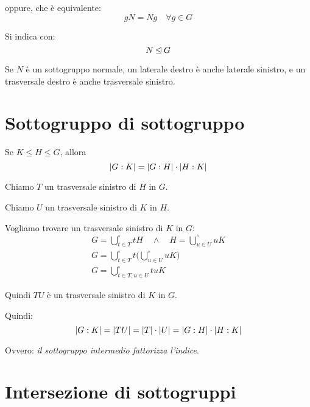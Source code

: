 oppure, che è equivalente:
\begin{equation*}
	gN = Ng \quad \forall g \in G
\end{equation*}

Si indica con:
\begin{equation*}
	N \unlhd G
\end{equation*}

Se $N$ è un sottogruppo normale, un laterale destro è anche laterale sinistro, e un trasversale destro è anche trasversale sinistro.

\section{Sottogruppo di sottogruppo}
\label{sec:sottogruppo di sottogruppo}

\begin{teorema}
	\label{thr:fattorizzazione_indici}
	Se $K \le H \le G$, allora
	\begin{equation*}
		\lvert G:K \rvert = \lvert G:H \rvert \cdot \lvert H:K \rvert
	\end{equation*}
\end{teorema}
\begin{dimostrazione}
	Chiamo $T$ un trasversale sinistro di $H$ in $G$.
	
	Chiamo $U$ un trasversale sinistro di $K$ in $H$.
	
	Vogliamo trovare un trasversale sinistro di $K$ in $G$:
	\begin{gather*}
		G = \bigcup^\circ_{t \in T} tH \quad\land\quad H = \bigcup^\circ_{u \in U} uK \\
		G = \bigcup^\circ_{t \in T} t \biggl(\bigcup^\circ_{u \in U} uK\biggr) \\
		G = \bigcup^\circ_{t \in T, u \in U} tuK
	\end{gather*}

	Quindi $TU$ è un trasversale sinistro di $K$ in $G$.
	
	Quindi:
	\begin{equation*}
		\lvert G:K \rvert = \lvert TU \rvert = \lvert T \rvert \cdot \lvert U \rvert = \lvert G:H \rvert \cdot \lvert H:K \rvert
	\end{equation*}

	Ovvero: \emph{il sottogruppo intermedio fattorizza l'indice}.
\end{dimostrazione}

\section{Intersezione di sottogruppi}
\label{sec:laterali_intersezione_sottogruppi}

